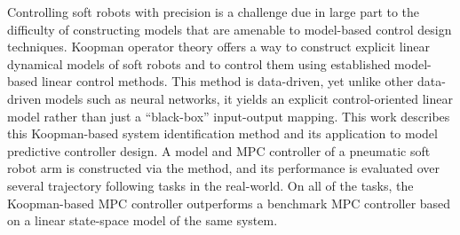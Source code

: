 Controlling soft robots with precision is a challenge due in large part to the difficulty of constructing models that are amenable to model-based control design techniques.
Koopman operator theory offers a way to construct explicit linear dynamical models of soft robots and to control them using established model-based linear control methods.
This method is data-driven, yet unlike other data-driven models such as neural networks, it yields an explicit control-oriented linear model rather than just a ``black-box'' input-output mapping.
This work describes this Koopman-based system identification method and its application to model predictive controller design.
A model and MPC controller of a pneumatic soft robot arm is constructed via the method, and its performance is evaluated over several trajectory following tasks in the real-world. 
On all of the tasks, the Koopman-based MPC controller outperforms a benchmark MPC controller based on a linear state-space model of the same system.